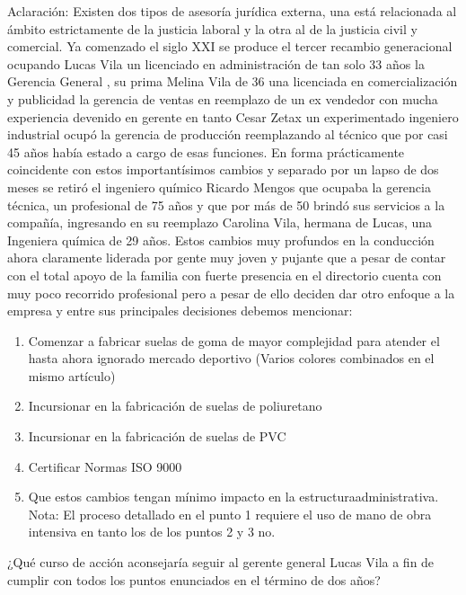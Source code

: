 \documentclass[a4paper,10pt]{article}
\begin{document}
	Aclaración: Existen dos tipos de asesoría jurídica externa, una está relacionada al ámbito estrictamente de la justicia laboral y la otra al de la justicia civil y comercial. Ya comenzado el siglo XXI se produce el tercer recambio generacional ocupando Lucas Vila un licenciado en administración de tan solo 33 años la Gerencia General , su prima Melina Vila de 36 una licenciada en comercialización y publicidad la gerencia de ventas en reemplazo de un ex vendedor con mucha experiencia devenido en gerente en tanto Cesar Zetax un experimentado ingeniero industrial ocupó la gerencia de producción reemplazando al técnico que por casi 45 años había estado a cargo de esas funciones.\newline
	En forma prácticamente coincidente con estos importantísimos cambios y separado por un lapso de dos meses se retiró el ingeniero químico Ricardo Mengos que ocupaba la gerencia técnica, un profesional de 75 años y que por más de 50 brindó sus servicios a la compañía, ingresando en su reemplazo Carolina Vila, hermana de Lucas, una Ingeniera química de 29 años.\newline
	Estos cambios muy profundos en la conducción ahora claramente liderada por gente muy joven y pujante que a pesar de contar con el total apoyo de la familia con fuerte presencia en el directorio cuenta con muy poco recorrido profesional pero a pesar de ello deciden dar otro enfoque a la empresa y entre sus principales decisiones debemos mencionar:\newline
	\begin{enumerate}
	\item Comenzar a fabricar suelas de goma de mayor complejidad para atender el hasta ahora ignorado mercado deportivo (Varios colores combinados en el mismo artículo)
	\item Incursionar en la fabricación de suelas de poliuretano
	\item Incursionar en la fabricación de suelas de PVC
	\item Certificar Normas ISO 9000
	\item Que estos cambios tengan mínimo impacto en la estructuraadministrativa.
	Nota: El proceso detallado en el punto 1 requiere el uso de mano de obra intensiva en tanto los de los puntos 2 y 3 no.		\end{enumerate}
	¿Qué curso de acción aconsejaría seguir al gerente general Lucas Vila a fin de cumplir con todos los puntos enunciados en el término de dos años?
		\newpage
\end{document}
